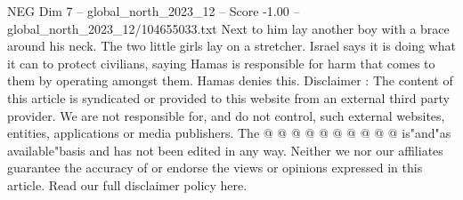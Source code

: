\begin{textsample}{NEG Dim 7 – global\_north\_2023\_12 – Score -1.00 – global\_north\_2023\_12/104655033.txt}
Next to him lay another boy with a brace around his neck.
The two little girls lay on a stretcher.
Israel says it is doing what it can to protect civilians, saying Hamas is responsible for harm that comes to them by operating amongst them.
Hamas denies this.
Disclaimer : The content of this article is syndicated or provided to this website from an external third party provider.
We are not responsible for, and do not control, such external websites, entities, applications or media publishers.
The @ @ @ @ @ @ @ @ @ @ is"and"as available"basis and has not been edited in any way.
Neither we nor our affiliates guarantee the accuracy of or endorse the views or opinions expressed in this article.
Read our full disclaimer policy here.

\end{textsample}
